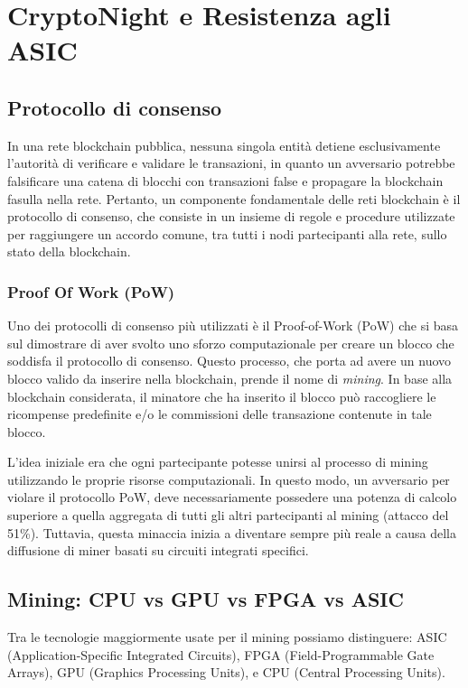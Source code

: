 \chapter{CryptoNight e Resistenza agli ASIC}
\section{Protocollo di consenso}
In una rete blockchain pubblica, nessuna singola entità detiene esclusivamente l'autorità di verificare e validare le transazioni, in quanto un avversario potrebbe falsificare una catena di blocchi con transazioni false e propagare la blockchain fasulla nella rete. 
Pertanto, un componente fondamentale delle reti blockchain è il protocollo di consenso, che consiste in un insieme di regole e procedure utilizzate per raggiungere un accordo comune, tra tutti i nodi partecipanti alla rete, sullo stato della blockchain.

\subsection{Proof Of Work (PoW)}
Uno dei protocolli di consenso più utilizzati è il Proof-of-Work (PoW) che si basa sul dimostrare di aver svolto uno sforzo computazionale per creare un blocco che soddisfa il protocollo di consenso. 
Questo processo, che porta ad avere un nuovo blocco valido da inserire nella blockchain, prende il nome di \textit{mining}.
In base alla blockchain considerata, il minatore che ha inserito il blocco può raccogliere le ricompense predefinite e/o le commissioni delle transazione contenute in tale blocco.

L'idea iniziale era che ogni partecipante potesse unirsi al processo di mining utilizzando le proprie risorse computazionali. 
In questo modo, un avversario per violare il protocollo PoW, deve necessariamente possedere una potenza di calcolo superiore a quella aggregata di tutti gli altri partecipanti al mining (attacco del 51\%). 
Tuttavia, questa minaccia inizia a diventare sempre più reale a causa della diffusione di miner basati su circuiti integrati specifici. 


\section{Mining: CPU vs GPU vs FPGA vs ASIC}
Tra le tecnologie maggiormente usate per il mining possiamo distinguere: ASIC (Application-Specific Integrated Circuits), FPGA (Field-Programmable Gate Arrays), GPU (Graphics Processing Units), e CPU (Central Processing Units). 

